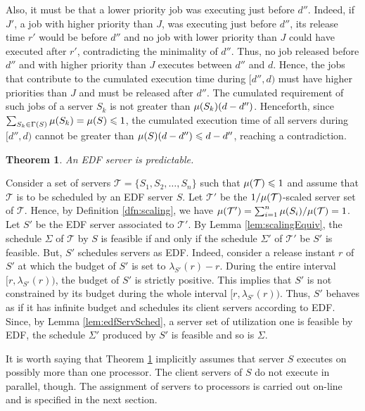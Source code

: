 \documentclass[twocolumn, compsocconf]{IEEEtran}
\newtheorem{theorem}{Theorem}[section]
\renewcommand{\leq}{\leqslant}
\newcommand{\sched}{\ensuremath{\Sigma}\xspace}
\newcommand{\clientOf}{\ensuremath{\Gamma}\xspace}
\newcommand{\servSet}{\ensuremath{\mathcal{T}}}
\newcounter{proc}
\begin{document}
\begin{IEEEproof}
  Also, it must be that a lower priority job was executing just before $d''$.
  Indeed, if $J'$, a job with higher priority than $J$, was executing just
  before $d''$, its release time $r'$ would be before $d''$ and no job with
  lower priority than $J$ could have executed after $r'$, contradicting the
  minimality of $d''$. Thus, no job released before $d''$ and with higher
  priority than $J$ executes between $d''$ and $d$.  Hence, the jobs that
  contribute to the cumulated execution time during $[d'',d)$ must have higher
  priorities than $J$ and must be released after $d''$. The cumulated
  requirement of such jobs of a server $S_k$ is not greater than $\mu(S_k)
  (d-d'')$. Henceforth, since $\sum_{S_k \in \clientOf(S)} \util(S_k) = \util(S)
  \leq 1$, the cumulated execution time of all servers during $[d'',d)$ cannot
  be greater than $\util(S)(d-d'') \leq d-d''$, reaching a contradiction.
\end{IEEEproof}

\begin{theorem}\label{thm:edfServPredict}
  An EDF server is predictable.
\end{theorem}

\begin{IEEEproof}
  Consider a set of servers $\servSet = \{S_1, S_2, \ldots, S_n\}$ such that
  $\util(\servSet) \leq 1$ and assume that $\servSet$ is to be scheduled by an
  EDF server $S$. Let $\servSet'$ be the $1/\util(\servSet)$-scaled server set
  of $\servSet$. Hence, by Definition \ref{dfn:scaling}, we have
  $\util(\servSet') = \sum_{i=1}^n \util(S_i) / \util(\servSet) = 1$. Let $S'$
  be the EDF server associated to $\servSet'$.  By Lemma \ref{lem:scalingEquiv},
  the schedule $\sched$ of $\servSet$ by $S$ is feasible if and only if the
  schedule $\sched'$ of $\servSet'$ be $S'$ is feasible.  But, $S'$ schedules
  servers as EDF. Indeed, consider a release instant $r$ of $S'$ at which the
  budget of $S'$ is set to $\lambda_{S'}(r) - r$. During the entire interval
  $[r, \lambda_{S'}(r))$, the budget of $S'$ is strictly positive. This implies
  that $S'$ is not constrained by its budget during the whole interval $[r,
  \lambda_{S'}(r))$. Thus, $S'$ behaves as if it has infinite budget and
  schedules its client servers according to EDF. Since, by Lemma
  \ref{lem:edfServSched}, a server set of utilization one is feasible by EDF,
  the schedule $\sched'$ produced by $S'$ is feasible and so is $\sched$.
\end{IEEEproof}

It is worth saying that Theorem \ref{thm:edfServPredict} implicitly assumes that
server $S$ executes on possibly more than one processor. The client servers of
$S$ do not execute in parallel, though. The assignment of servers to processors
is carried out on-line and is specified in the next section.
\end{document}
